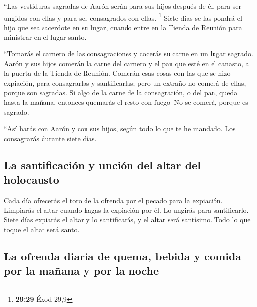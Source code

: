 \begin{paracol}{2}
 ``Las vestiduras sagradas de Aarón serán para sus hijos
después de él, para ser ungidos con ellas y para ser consagrados con
ellas. \footnote{\textbf{29:29} Éxod 29,9}  Siete días se
las pondrá el hijo que sea sacerdote en su lugar, cuando entre en la
Tienda de Reunión para ministrar en el lugar santo.

 ``Tomarás el carnero de las consagraciones y cocerás su
carne en un lugar sagrado.  Aarón y sus hijos comerán la
carne del carnero y el pan que esté en el canasto, a la puerta de la
Tienda de Reunión.  Comerán esas cosas con las que se
hizo expiación, para consagrarlas y santificarlas; pero un extraño no
comerá de ellas, porque son sagradas.  Si algo de la
carne de la consagración, o del pan, queda hasta la mañana, entonces
quemarás el resto con fuego. No se comerá, porque es sagrado.

 ``Así harás con Aarón y con sus hijos, según todo lo que
te he mandado. Los consagrarás durante siete días.

\hypertarget{la-santificaciuxf3n-y-unciuxf3n-del-altar-del-holocausto}{%
\subsection{La santificación y unción del altar del
holocausto}\label{la-santificaciuxf3n-y-unciuxf3n-del-altar-del-holocausto}}

 Cada día ofrecerás el toro de la ofrenda por el pecado
para la expiación. Limpiarás el altar cuando hagas la expiación por él.
Lo ungirás para santificarlo.  Siete días expiarás el
altar y lo santificarás, y el altar será santísimo. Todo lo que toque el
altar será santo.

\hypertarget{la-ofrenda-diaria-de-quema-bebida-y-comida-por-la-mauxf1ana-y-por-la-noche}{%
\subsection{La ofrenda diaria de quema, bebida y comida por la mañana y
por la
noche}\label{la-ofrenda-diaria-de-quema-bebida-y-comida-por-la-mauxf1ana-y-por-la-noche}}


\end{paracol}
